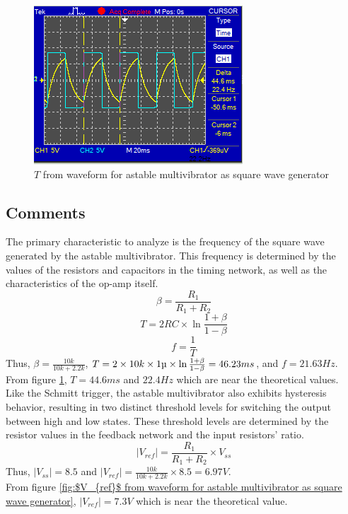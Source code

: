 \documentclass[a4paper, 12pt, english]{article}
\newlength{\simheight}
\begin{document}
\begin{figure}[H]
    \centering
    \includegraphics[width=\linewidth, height=\simheight]{images/Square-Wave-Generator-T-Cursor.png}
    \caption{$T$ from waveform for astable multivibrator as square wave generator}
    \label{fig:T from waveform for astable multivibrator as square wave generator}
\end{figure}

\subsection{Comments}
The primary characteristic to analyze is the frequency of the square wave generated by the astable multivibrator. This frequency is determined by the values of the resistors and capacitors in the timing network, as well as the characteristics of the op-amp itself.
\[ \beta = \frac{R_{1}}{R_{1}+R_{2}}\]
\[ T = 2RC \times \ln{\frac{1+\beta}{1-\beta}}\]
\[ f = \frac{1}{T}\]
Thus, \( \beta = \frac{10k}{10k + 2.2k}\), \( T = 2\times 10k \times 1\micro \times \ln{\frac{1+\beta}{1-\beta}} = 46.23 ms\), and \( f = 21.63Hz\). \\
From figure \ref{fig:T from waveform for astable multivibrator as square wave generator}, $T=44.6ms$ and $22.4Hz$ which are near the theoretical values. \\

Like the Schmitt trigger, the astable multivibrator also exhibits hysteresis behavior, resulting in two distinct threshold levels for switching the output between high and low states. These threshold levels are determined by the resistor values in the feedback network and the input resistors' ratio.
\[ |V_{ref}| = \frac{R_{1}}{R_{1} + R_{2}}  \times V_{ss}\]
Thus, $|V_{ss}|=8.5$ and \(|V_{ref}|=\frac{10k}{10k+2.2k}\times8.5=6.97V\). \\
From figure \ref{fig:$V_{ref}$ from waveform for astable multivibrator as square wave generator}, $|V_{ref}|=7.3V$ which is near the theoretical value.

\newpage

\patchcmd{\thebibliography}{\section*}{\section}{}{}
\end{document}
